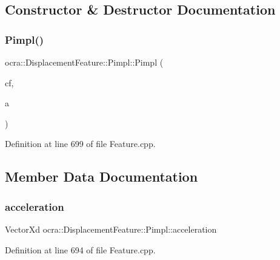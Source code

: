 \subsection{Constructor \& Destructor Documentation}
\hypertarget{structocra_1_1DisplacementFeature_1_1Pimpl_a74a8e0493ff78e399aef5f07e4a092e3}{}\label{structocra_1_1DisplacementFeature_1_1Pimpl_a74a8e0493ff78e399aef5f07e4a092e3} 
\subsubsection{\texorpdfstring{Pimpl()}{Pimpl()}}
{\footnotesize\ttfamily ocra\+::\+Displacement\+Feature\+::\+Pimpl\+::\+Pimpl (\begin{DoxyParamCaption}\item[{Control\+Frame\+::\+Ptr}]{cf,  }\item[{\hyperlink{namespaceocra_a436781c7059a0f76027df1c652126260}{E\+Cartesian\+Dof}}]{a }\end{DoxyParamCaption})\hspace{0.3cm}{\ttfamily [inline]}}



Definition at line 699 of file Feature.\+cpp.



\subsection{Member Data Documentation}
\hypertarget{structocra_1_1DisplacementFeature_1_1Pimpl_a1495e4c5c743c4c82a7948a9c6911e31}{}\label{structocra_1_1DisplacementFeature_1_1Pimpl_a1495e4c5c743c4c82a7948a9c6911e31} 
\subsubsection{\texorpdfstring{acceleration}{acceleration}}
{\footnotesize\ttfamily Vector\+Xd ocra\+::\+Displacement\+Feature\+::\+Pimpl\+::acceleration}



Definition at line 694 of file Feature.\+cpp.

